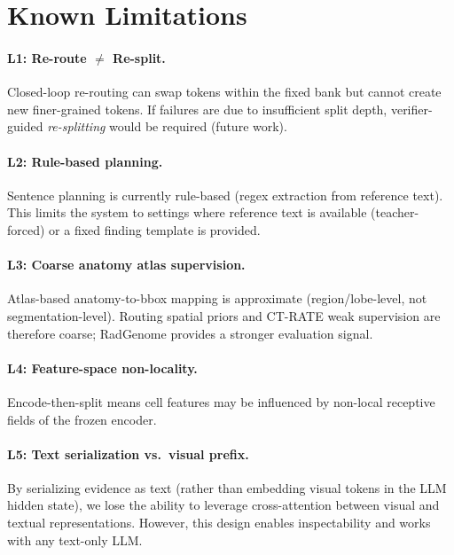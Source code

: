 \documentclass[11pt,a4paper]{article}
\begin{document}

\section{Known Limitations}
\label{sec:limitations}

\paragraph{L1: Re-route $\neq$ Re-split.}
Closed-loop re-routing can swap tokens within the fixed bank but cannot create new finer-grained tokens.
If failures are due to insufficient split depth, verifier-guided \emph{re-splitting} would be required (future work).

\paragraph{L2: Rule-based planning.}
Sentence planning is currently rule-based (regex extraction from reference text). This limits the system to settings where reference text is available (teacher-forced) or a fixed finding template is provided.

\paragraph{L3: Coarse anatomy atlas supervision.}
Atlas-based anatomy-to-bbox mapping is approximate (region/lobe-level, not segmentation-level).
Routing spatial priors and CT-RATE weak supervision are therefore coarse; RadGenome provides a stronger evaluation signal.

\paragraph{L4: Feature-space non-locality.}
Encode-then-split means cell features may be influenced by non-local receptive fields of the frozen encoder.

\paragraph{L5: Text serialization vs.\ visual prefix.}
By serializing evidence as text (rather than embedding visual tokens in the LLM hidden state), we lose the ability to leverage cross-attention between visual and textual representations. However, this design enables inspectability and works with any text-only LLM.
\end{document}
